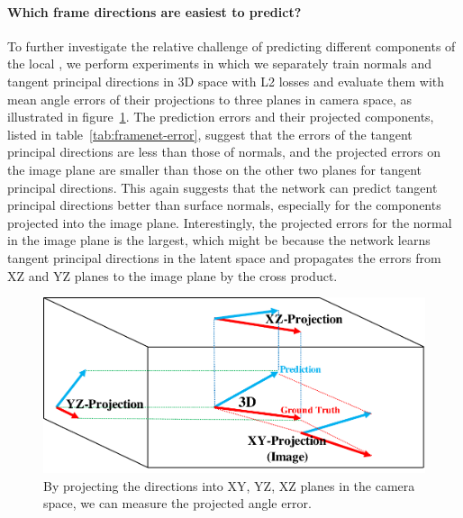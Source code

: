 \paragraph{Which frame directions are easiest to predict?}  To further investigate the relative challenge of predicting different components of the local \cframe{}, we perform experiments in which we separately train normals and tangent principal directions in 3D space with L2 losses and evaluate them with mean angle errors of their projections to three planes in camera space, as illustrated in figure~\ref{fig:framenet-err-proj}.  The prediction errors and their projected components, listed in table~\ref{tab:framenet-error}, suggest
that the errors of the tangent principal directions are less than those of normals, and the projected errors on the image plane are smaller than those on the other two planes for tangent principal directions.  This again suggests that the network can predict tangent principal directions better than surface normals, especially for the components projected into the image plane.  Interestingly, the projected errors for the normal in the image plane is the largest, which might be because the network learns tangent principal directions in the latent space and propagates the errors from XZ and YZ planes to the image plane by the cross product.
\begin{figure}
    \centering
    \includegraphics[width=0.6\linewidth]{FrameNet/graph/angleproj.pdf}
    \caption{By projecting the directions into XY, YZ, XZ planes in the camera space, we can measure the projected angle error.}
    \label{fig:framenet-err-proj}
\end{figure}


